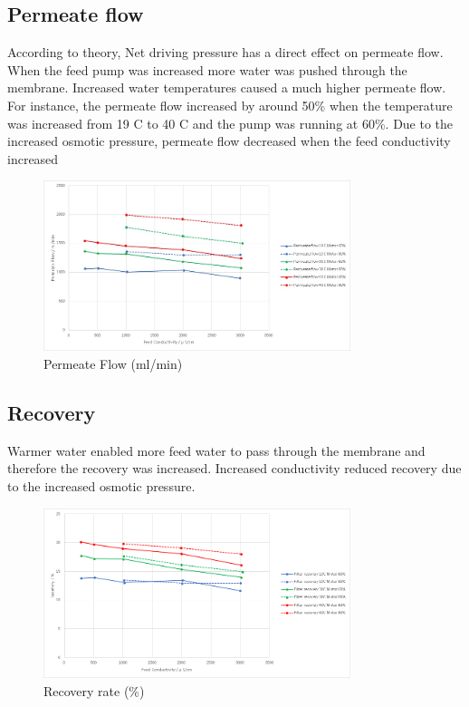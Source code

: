 \subsection{Permeate flow}

According to theory, Net driving pressure has a direct effect on permeate flow. When the feed pump was increased more water was pushed through the membrane. Increased water temperatures caused a much higher permeate flow. For instance, the permeate flow increased by around 50\% when the temperature was increased from 19 C to 40 C and the pump was running at 60\%. Due to the increased osmotic pressure, permeate flow decreased when the feed conductivity increased

\begin{figure}[H]
    \centering
    \includegraphics[width=0.8\textwidth]{permFlowCurrent}
    \caption{Permeate Flow (ml/min)}
    \label{fig:PermFC}
\end{figure}

\subsection{Recovery}

Warmer water enabled more feed water to pass through the membrane and therefore the recovery was increased. Increased conductivity reduced recovery due to the increased osmotic pressure.

\begin{figure}[H]
    \centering
    \includegraphics[width=0.8\textwidth]{Recovery}
    \caption{Recovery rate (\%)}
    \label{fig:rec}
\end{figure}

